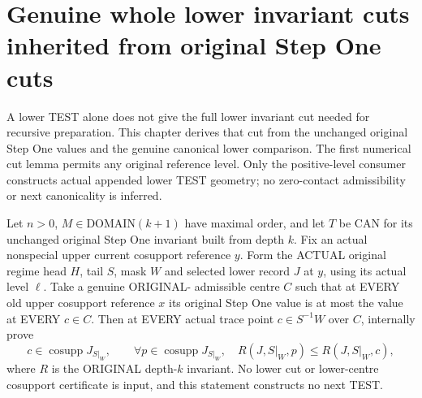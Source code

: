 \section{Genuine whole lower invariant cuts inherited from original Step One cuts}

A lower TEST alone does not give the full lower invariant cut needed for
recursive preparation. This chapter derives that cut from the unchanged
original Step One values and the genuine canonical lower comparison. The
first numerical cut lemma permits any original reference level. Only the
positive-level consumer constructs actual appended lower TEST geometry;
no zero-contact admissibility or next canonicality is inferred.

\begin{theorem}
\label{hir:original-stepone-whole-cut-inherited-lower-value}
\leanok
Let $n>0$, $M\in\mathrm{DOMAIN}(k+1)$ have maximal order, and let $T$ be
CAN for its unchanged original Step One invariant built from depth $k$.
Fix an actual nonspecial upper current cosupport reference $y$. Form the
ACTUAL original regime head $H$, tail $S$, mask $W$ and selected lower
record $J$ at $y$, using its actual level $\ell$. Take a genuine ORIGINAL-
admissible centre $C$ such that at EVERY old upper cosupport reference $x$
its original Step One value is at most the value at EVERY $c\in C$.
Then at EVERY actual trace point $c\in S^{-1}W$ over $C$, internally prove
\[
 c\in\operatorname{cosupp}J_{S|_W},\qquad
 \forall p\in\operatorname{cosupp}J_{S|_W},\quad
 R(J,S|_W,p)\le R(J,S|_W,c),
\]
where $R$ is the ORIGINAL depth-$k$ invariant. No lower cut or lower-centre
cosupport certificate is input, and this statement constructs no next TEST.
\end{theorem}
